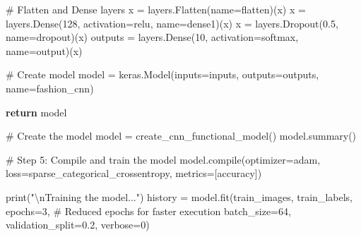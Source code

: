 \documentclass[
  letterpaper,
  DIV=11,
  numbers=noendperiod]{scrreprt}
\newenvironment{Shaded}{\begin{snugshade}}{\end{snugshade}}
\newcommand{\BuiltInTok}[1]{\textcolor[rgb]{0.00,0.23,0.31}{#1}}
\newcommand{\CharTok}[1]{\textcolor[rgb]{0.13,0.47,0.30}{#1}}
\newcommand{\CommentTok}[1]{\textcolor[rgb]{0.37,0.37,0.37}{#1}}
\newcommand{\ControlFlowTok}[1]{\textcolor[rgb]{0.00,0.23,0.31}{\textbf{#1}}}
\newcommand{\DecValTok}[1]{\textcolor[rgb]{0.68,0.00,0.00}{#1}}
\newcommand{\FloatTok}[1]{\textcolor[rgb]{0.68,0.00,0.00}{#1}}
\newcommand{\NormalTok}[1]{\textcolor[rgb]{0.00,0.23,0.31}{#1}}
\newcommand{\OperatorTok}[1]{\textcolor[rgb]{0.37,0.37,0.37}{#1}}
\newcommand{\StringTok}[1]{\textcolor[rgb]{0.13,0.47,0.30}{#1}}
\begin{document}
\begin{Shaded}
\begin{Highlighting}[]
    \CommentTok{\# Flatten and Dense layers}
\NormalTok{    x }\OperatorTok{=}\NormalTok{ layers.Flatten(name}\OperatorTok{=}\StringTok{\textquotesingle{}flatten\textquotesingle{}}\NormalTok{)(x)}
\NormalTok{    x }\OperatorTok{=}\NormalTok{ layers.Dense(}\DecValTok{128}\NormalTok{, activation}\OperatorTok{=}\StringTok{\textquotesingle{}relu\textquotesingle{}}\NormalTok{, name}\OperatorTok{=}\StringTok{\textquotesingle{}dense1\textquotesingle{}}\NormalTok{)(x)}
\NormalTok{    x }\OperatorTok{=}\NormalTok{ layers.Dropout(}\FloatTok{0.5}\NormalTok{, name}\OperatorTok{=}\StringTok{\textquotesingle{}dropout\textquotesingle{}}\NormalTok{)(x)}
\NormalTok{    outputs }\OperatorTok{=}\NormalTok{ layers.Dense(}\DecValTok{10}\NormalTok{, activation}\OperatorTok{=}\StringTok{\textquotesingle{}softmax\textquotesingle{}}\NormalTok{, name}\OperatorTok{=}\StringTok{\textquotesingle{}output\textquotesingle{}}\NormalTok{)(x)}
    
    \CommentTok{\# Create model}
\NormalTok{    model }\OperatorTok{=}\NormalTok{ keras.Model(inputs}\OperatorTok{=}\NormalTok{inputs, outputs}\OperatorTok{=}\NormalTok{outputs, name}\OperatorTok{=}\StringTok{\textquotesingle{}fashion\_cnn\textquotesingle{}}\NormalTok{)}
    
    \ControlFlowTok{return}\NormalTok{ model}

\CommentTok{\# Create the model}
\NormalTok{model }\OperatorTok{=}\NormalTok{ create\_cnn\_functional\_model()}
\NormalTok{model.summary()}

\CommentTok{\# Step 5: Compile and train the model}
\NormalTok{model.}\BuiltInTok{compile}\NormalTok{(optimizer}\OperatorTok{=}\StringTok{\textquotesingle{}adam\textquotesingle{}}\NormalTok{,}
\NormalTok{              loss}\OperatorTok{=}\StringTok{\textquotesingle{}sparse\_categorical\_crossentropy\textquotesingle{}}\NormalTok{,}
\NormalTok{              metrics}\OperatorTok{=}\NormalTok{[}\StringTok{\textquotesingle{}accuracy\textquotesingle{}}\NormalTok{])}

\BuiltInTok{print}\NormalTok{(}\StringTok{"}\CharTok{\textbackslash{}n}\StringTok{Training the model..."}\NormalTok{)}
\NormalTok{history }\OperatorTok{=}\NormalTok{ model.fit(train\_images, train\_labels, }
\NormalTok{                   epochs}\OperatorTok{=}\DecValTok{3}\NormalTok{,  }\CommentTok{\# Reduced epochs for faster execution}
\NormalTok{                   batch\_size}\OperatorTok{=}\DecValTok{64}\NormalTok{,}
\NormalTok{                   validation\_split}\OperatorTok{=}\FloatTok{0.2}\NormalTok{,}
\NormalTok{                   verbose}\OperatorTok{=}\DecValTok{0}\NormalTok{)}


\end{Highlighting}
\end{Shaded}
\end{document}
